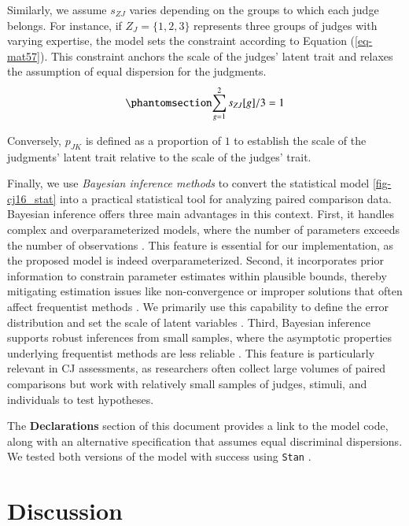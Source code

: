 \documentclass[
  authoryear,
  review,
  1p]{elsarticle}
\begin{document}
Similarly, we assume \(s_{ZJ}\) varies depending on the groups to which
each judge belongs. For instance, if \(Z_{J} = \{1,2,3\}\) represents
three groups of judges with varying expertise, the model sets the
constraint according to Equation (\ref{eq-mat57}). This constraint
anchors the scale of the judges' latent trait and relaxes the assumption
of equal dispersion for the judgments.
\begin{equation}\phantomsection\label{eq-mat57}{
\sum_{g=1}^{2} s_{ZJ}[g]/3 = 1
}\end{equation}

Conversely, \(p_{JK}\) is defined as a proportion of \(1\) to establish
the scale of the judgments' latent trait relative to the scale of the
judges' trait.

Finally, we use \emph{Bayesian inference methods} to convert the
statistical model \ref{fig-cj16_stat} into a practical statistical tool
for analyzing paired comparison data. Bayesian inference offers three
main advantages in this context. First, it handles complex and
overparameterized models, where the number of parameters exceeds the
number of observations \citep{Baker_1998, Kim_et_al_1999}. This feature
is essential for our implementation, as the proposed model is indeed
overparameterized. Second, it incorporates prior information to
constrain parameter estimates within plausible bounds, thereby
mitigating estimation issues like non-convergence or improper solutions
that often affect frequentist methods
\citep{Martin_et_al_1975, Seaman_et_al_2011}. We primarily use this
capability to define the error distribution and set the scale of latent
variables \citep{Depaoli_2014}. Third, Bayesian inference supports
robust inferences from small samples, where the asymptotic properties
underlying frequentist methods are less reliable
\citep{Baldwin_et_al_2013, Lambert_et_al_2006, Depaoli_2014}. This
feature is particularly relevant in CJ assessments, as researchers often
collect large volumes of paired comparisons but work with relatively
small samples of judges, stimuli, and individuals to test hypotheses.

The \textbf{Declarations} section of this document provides a link to
the model code, along with an alternative specification that assumes
equal discriminal dispersions. We tested both versions of the model with
success using \texttt{Stan} \citep[version 2.26.1]{Stan_2020}.

\section{Discussion}\label{sec-discussion}
\end{document}
